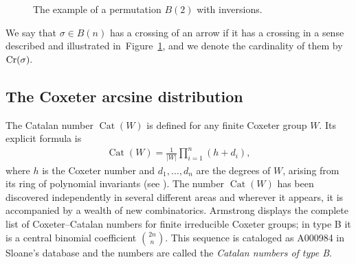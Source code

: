 \documentclass[pdftex]{sigma}
\numberwithin{equation}{section}
\def\Cr{\text{\normalfont Cr}}
\begin{document}
\begin{figure}[htp]
\vspace{-5mm}

\caption{The example of a permutation $B(2)$ with inversions.}
\label{permutacjeexmpale}
\end{figure}

\begin{Remark}%
We say that $\sigma\in B(n)$ has a crossing of an arrow if it has a crossing in a sense described and illustrated in~Figure~\ref{permutacjeexmpale}, and we denote the cardinality of them by $\Cr(\sigma). $
\end{Remark}

\subsection{The Coxeter arcsine distribution}
The Catalan number
$\operatorname{Cat}(W)$ is defined for any finite Coxeter group $W$.
Its
explicit formula is
\begin{align*}
\operatorname{Cat}(W)=\frac{1}{|W|}\prod_{i=1}^n(h+d_i),
\end{align*}
where $h$ is the Coxeter number and $d_1,\dots,d_n$ are the degrees of $W$, arising
from its ring of polynomial invariants (see \cite[Section 2.7]{Armstrong}). The number $\operatorname{Cat}(W)$ has
been discovered independently in several different areas and wherever it appears, it
is accompanied by a wealth of new combinatorics.
Armstrong \cite[p.~39, Table 2.8]{Armstrong} displays the complete list of Coxeter--Catalan numbers for finite irreducible Coxeter groups;
in type B it is a central binomial coefficient
$
{2n}\choose{n}$.
This sequence is cataloged as A000984 in Sloane’s database \cite{Sloane} and the numbers are
called the \emph{Catalan numbers of type B}.
\end{document}
